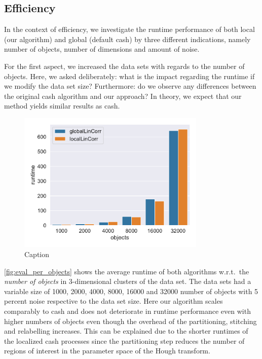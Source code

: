 \subsection{Efficiency}
In the context of efficiency, we investigate the runtime performance of both local (our algorithm) and global (default \gls{cash}) by three different indications, namely number of objects, number of dimensions and amount of noise.

For the first aspect, we increased the data sets with regards to the number of objects. Here, we asked deliberately: what is the impact regarding the runtime if we modify the data set size?
Furthermore: do we observe any differences between the original \gls{cash} algorithm and our approach? In theory, we expect that our method yields similar results as \gls{cash}.


\begin{figure}[h]
    \centering
    \includegraphics[width=0.8\textwidth]{evaluation/per_objects/Avg_Runtime_3D_N5_pobjects_bar.pdf}
    \caption{Caption}
    \label{fig:eval_per_objects}   
\end{figure}

\autoref{fig:eval_per_objects} shows the average runtime of both algorithms w.r.t.\ the \textit{number of objects} in 3-dimensional clusters of the data set. The data sets had a variable size of 1000, 2000, 4000, 8000, 16000 and 32000 number of objects with 5 percent noise respective to the data set size. Here our algorithm scales comparably to \gls{cash} and does not deteriorate in runtime performance even with higher numbers of objects even though the overhead of the partitioning, stitching and relabelling increases. This can be explained due to the shorter runtimes of the localized \gls{cash} processes since the partitioning step reduces the number of regions of interest in the parameter space of the Hough transform.\\

